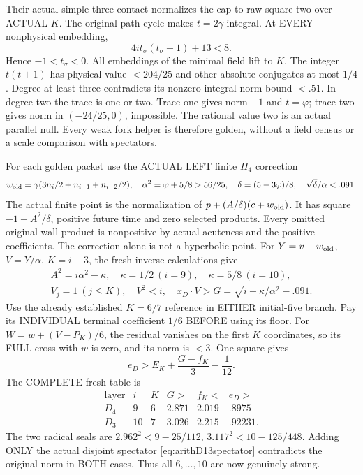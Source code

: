 \documentclass[11pt]{article}
\begin{document}
Their actual simple-three contact normalizes the
cap to raw square two over ACTUAL \(K\).
The original path cycle makes \(t=2\gamma\) integral.
At EVERY nonphysical embedding,
\[
                     4it_\sigma(t_\sigma+1)+13<8 .
\]
Hence \(-1<t_\sigma<0\).
All embeddings of the minimal field lift to \(K\).
The integer \(t(t+1)\) has physical value \(<204/25\)
and other absolute conjugates at most \(1/4\).
Degree at least three contradicts its nonzero
integral norm bound \(<.51\).
In degree two the trace is one or two.
Trace one gives norm \(-1\) and \(t=\varphi\);
trace two gives norm in \((-24/25,0)\), impossible.
The rational value two is an actual parallel null.
Every weak fork helper is therefore golden,
without a field census or a scale comparison
with spectators.

For each golden packet use the ACTUAL LEFT finite
\(H_4\) correction
\[
 w_{\rm old}=\gamma(3n_i/2+n_{i-1}+n_{i-2}/2),\quad
 \alpha^2=\varphi+5/8>56/25,\quad
 \delta=(5-3\varphi)/8,\quad \sqrt\delta/\alpha<.091 .
\]
The actual finite point is the normalization of
\(p+(A/\delta)(c+w_{\rm old})\).
It has square \(-1-A^2/\delta\), positive future
time and zero selected products.
Every omitted original-wall product is nonpositive
by actual acuteness and the positive coefficients.
The correction alone is not a hyperbolic point.
For \(Y=v-w_{\rm old}\), \(V=Y/\alpha\), \(K=i-3\),
the fresh inverse calculations give
\[
 \begin{gathered}
 A^2=i\alpha^2-\kappa,\quad
 \kappa=1/2\ (i=9),\quad \kappa=5/8\ (i=10),\\
 V_j=1\ (j\le K),\quad V^2<i,\quad
 x_D\cdot V>G=\sqrt{i-\kappa/\alpha^2}-.091 .
 \end{gathered}
\]
Use the already established \(K=6/7\) reference
in EITHER initial-five branch.
Pay its INDIVIDUAL terminal coefficient \(1/6\)
BEFORE using its floor.
For \(W=w+(V-P_K)/6\), the residual vanishes
on the first \(K\) coordinates, so its FULL
cross with \(w\) is zero, and its norm is \(<3\).
One square gives
\[
                         e_D>E_K+{\frac{G-f_K}{3}}-{\frac{1}{12}}.
\]
The COMPLETE fresh table is
\[
\begin{array}{c|c|c|c|c|c}
 \text{layer}&i&K&G>&f_K<&e_D>\\ \hline
 D_4&9&6&2.871&2.019&.8975\\
 D_3&10&7&3.026&2.215&.92231 .
\end{array}
\]
The two radical seals are
\(2.962^2<9-25/112\),
\(3.117^2<10-125/448\).
Adding ONLY the actual disjoint spectator
\eqref{eq:arithD13spectator} contradicts the
original norm in BOTH cases.
Thus all \(6,\ldots,10\) are now genuinely strong.
\end{document}
